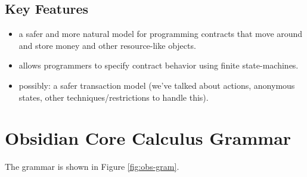 \documentclass[runningheads,a4paper]{llncs}
\begin{document}
\subsection{Key Features}

\begin{itemize}
\item a safer and more natural model for programming contracts that move around and store money and other resource-like objects.
\item allows programmers to specify contract behavior using finite state-machines.
\item possibly: a safer transaction model (we've talked about actions, anonymous states, other techniques/restrictions to handle this).
\end{itemize}

\fi

\section{Obsidian Core Calculus Grammar}

The grammar is shown in Figure \ref{fig:obs-gram}.\\

\newcommand{\stateS}{\texttt{state}}
\newcommand{\ownedS}{\texttt{owned}}
\newcommand{\readonlyS}{\texttt{readonly}}
\newcommand{\sharedS}{\texttt{shared}}
\newcommand{\contractS}{\texttt{contract}}
\newcommand{\extcontractS}{\texttt{external\ contract}}
\newcommand{\letS}{\texttt{let}}
\newcommand{\throwS}{\texttt{throw}}
\newcommand{\tryS}{\texttt{try}}
\newcommand{\catchS}{\texttt{catch}}
\newcommand{\thisS}{\texttt{this}}
\newcommand{\inS}{\texttt{in}}
\newcommand{\caseS}{\texttt{case}}
\newcommand{\switchS}{\texttt{switch}}
\newcommand{\newS}{\texttt{new}}
\newcommand{\permS}{\triangleright}
\newcommand{\functionS}{\texttt{function}}
\newcommand{\transactionS}{\texttt{transaction}}
\newcommand{\voidS}{\textsf{void}}
\newcommand{\unpackS}{\texttt{unpack}}
\newcommand{\packS}{\texttt{pack_to}}
\newcommand{\withS}{\texttt{returns}}
\newcommand{\asS}{\texttt{as}}
\newcommand{\ofS}{\texttt{managed_by}}
\newcommand{\trueS}{\textsf{t}}
\newcommand{\falseS}{\textsf{f}}
\end{document}
